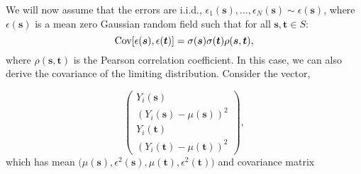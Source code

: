 We will now assume that the errors are i.i.d., $\epsilon_{1}(\bm{s}), ..., \epsilon_{N}(\bm{s}) \sim \epsilon(\bm{s})$, where $\epsilon(\bm{s})$ is a mean zero Gaussian random field such that for all $\bm{s}, \bm{t} \in S$:
\begin{equation}
\label{eq:covariance_of_errors}
\operatorname{\mathrm{Cov}}[\epsilon(\bm{s}),\epsilon(\bm{t})] = \sigma(\bm{s})\sigma(\bm{t})\rho(\bm{s},\bm{t}),
\end{equation}
where $\rho(\bm{s},\bm{t})$ is the Pearson correlation coefficient. In this case, we can also derive the covariance of the limiting distribution. Consider the vector,

\begin{equation}
\label{eq:16}
\begin{pmatrix}
	Y_i(\bm{s}) \\
    (Y_i(\bm{s}) - \mu(\bm{s}))^{2} \\
    Y_i(\bm{t}) \\
    (Y_i(\bm{t}) - \mu(\bm{t}))^{2} 
\end{pmatrix},
\end{equation}
which has mean $\Big(\mu(\bm{s}),\epsilon^{2}(\bm{s}),\mu(\bm{t}),\epsilon^{2}(\bm{t})\Big)$ and covariance matrix

